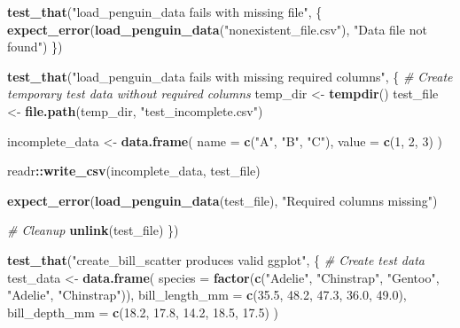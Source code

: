 \documentclass[
]{article}
\newenvironment{Shaded}{\begin{snugshade}}{\end{snugshade}}
\newcommand{\AttributeTok}[1]{\textcolor[rgb]{0.13,0.29,0.53}{#1}}
\newcommand{\CommentTok}[1]{\textcolor[rgb]{0.56,0.35,0.01}{\textit{#1}}}
\newcommand{\DecValTok}[1]{\textcolor[rgb]{0.00,0.00,0.81}{#1}}
\newcommand{\FloatTok}[1]{\textcolor[rgb]{0.00,0.00,0.81}{#1}}
\newcommand{\FunctionTok}[1]{\textcolor[rgb]{0.13,0.29,0.53}{\textbf{#1}}}
\newcommand{\NormalTok}[1]{#1}
\newcommand{\OtherTok}[1]{\textcolor[rgb]{0.56,0.35,0.01}{#1}}
\newcommand{\SpecialCharTok}[1]{\textcolor[rgb]{0.81,0.36,0.00}{\textbf{#1}}}
\newcommand{\StringTok}[1]{\textcolor[rgb]{0.31,0.60,0.02}{#1}}
\begin{document}
\begin{Shaded}
\begin{Highlighting}[]
\FunctionTok{test\_that}\NormalTok{(}\StringTok{"load\_penguin\_data fails with missing file"}\NormalTok{, \{}
  \FunctionTok{expect\_error}\NormalTok{(}\FunctionTok{load\_penguin\_data}\NormalTok{(}\StringTok{"nonexistent\_file.csv"}\NormalTok{), }\StringTok{"Data file not found"}\NormalTok{)}
\NormalTok{\})}

\FunctionTok{test\_that}\NormalTok{(}\StringTok{"load\_penguin\_data fails with missing required columns"}\NormalTok{, \{}
  \CommentTok{\# Create temporary test data without required columns}
\NormalTok{  temp\_dir }\OtherTok{\textless{}{-}} \FunctionTok{tempdir}\NormalTok{()}
\NormalTok{  test\_file }\OtherTok{\textless{}{-}} \FunctionTok{file.path}\NormalTok{(temp\_dir, }\StringTok{"test\_incomplete.csv"}\NormalTok{)}

\NormalTok{  incomplete\_data }\OtherTok{\textless{}{-}} \FunctionTok{data.frame}\NormalTok{(}
    \AttributeTok{name =} \FunctionTok{c}\NormalTok{(}\StringTok{"A"}\NormalTok{, }\StringTok{"B"}\NormalTok{, }\StringTok{"C"}\NormalTok{),}
    \AttributeTok{value =} \FunctionTok{c}\NormalTok{(}\DecValTok{1}\NormalTok{, }\DecValTok{2}\NormalTok{, }\DecValTok{3}\NormalTok{)}
\NormalTok{  )}

\NormalTok{  readr}\SpecialCharTok{::}\FunctionTok{write\_csv}\NormalTok{(incomplete\_data, test\_file)}

  \FunctionTok{expect\_error}\NormalTok{(}\FunctionTok{load\_penguin\_data}\NormalTok{(test\_file), }\StringTok{"Required columns missing"}\NormalTok{)}

  \CommentTok{\# Cleanup}
  \FunctionTok{unlink}\NormalTok{(test\_file)}
\NormalTok{\})}

\FunctionTok{test\_that}\NormalTok{(}\StringTok{"create\_bill\_scatter produces valid ggplot"}\NormalTok{, \{}
  \CommentTok{\# Create test data}
\NormalTok{  test\_data }\OtherTok{\textless{}{-}} \FunctionTok{data.frame}\NormalTok{(}
    \AttributeTok{species =} \FunctionTok{factor}\NormalTok{(}\FunctionTok{c}\NormalTok{(}\StringTok{"Adelie"}\NormalTok{, }\StringTok{"Chinstrap"}\NormalTok{, }\StringTok{"Gentoo"}\NormalTok{, }\StringTok{"Adelie"}\NormalTok{, }\StringTok{"Chinstrap"}\NormalTok{)),}
    \AttributeTok{bill\_length\_mm =} \FunctionTok{c}\NormalTok{(}\FloatTok{35.5}\NormalTok{, }\FloatTok{48.2}\NormalTok{, }\FloatTok{47.3}\NormalTok{, }\FloatTok{36.0}\NormalTok{, }\FloatTok{49.0}\NormalTok{),}
    \AttributeTok{bill\_depth\_mm =} \FunctionTok{c}\NormalTok{(}\FloatTok{18.2}\NormalTok{, }\FloatTok{17.8}\NormalTok{, }\FloatTok{14.2}\NormalTok{, }\FloatTok{18.5}\NormalTok{, }\FloatTok{17.5}\NormalTok{)}
\NormalTok{  )}


\end{Highlighting}
\end{Shaded}
\end{document}
